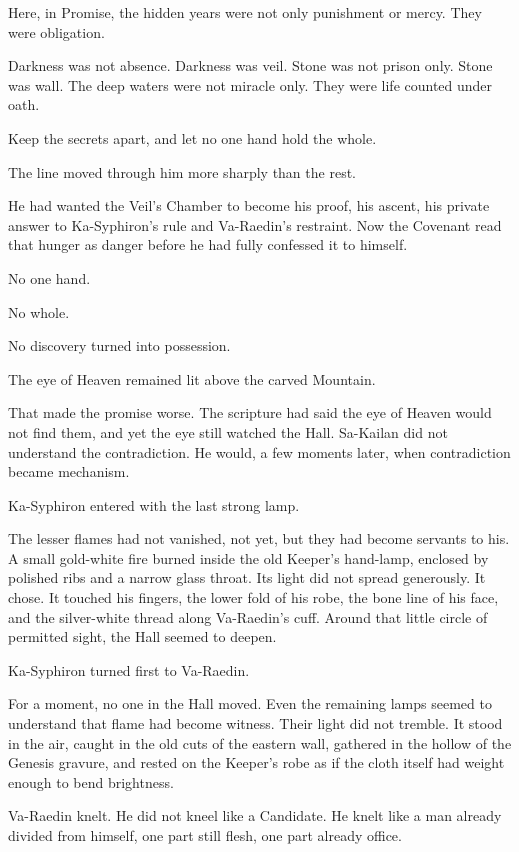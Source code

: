 Here, in Promise, the hidden years were not only punishment or mercy.
They were obligation.\par
Darkness was not absence.
Darkness was veil.
Stone was not prison only.
Stone was wall.
The deep waters were not miracle only.
They were life counted under oath.\par
Keep the secrets apart, and let no one hand hold the whole.\par
The line moved through him more sharply than the rest.\par
He had wanted the Veil’s Chamber to become his proof, his ascent, his private answer to Ka-Syphiron’s rule and Va-Raedin’s restraint.
Now the Covenant read that hunger as danger before he had fully confessed it to himself.\par
No one hand.\par
No whole.\par
No discovery turned into possession.\par
The eye of Heaven remained lit above the carved Mountain.\par
That made the promise worse.
The scripture had said the eye of Heaven would not find them, and yet the eye still watched the Hall.
Sa-Kailan did not understand the contradiction.
He would, a few moments later, when contradiction became mechanism.\par
Ka-Syphiron entered with the last strong lamp.\par
The lesser flames had not vanished, not yet, but they had become servants to his.
A small gold-white fire burned inside the old Keeper’s hand-lamp, enclosed by polished ribs and a narrow glass throat.
Its light did not spread generously.
It chose.
It touched his fingers, the lower fold of his robe, the bone line of his face, and the silver-white thread along Va-Raedin’s cuff.
Around that little circle of permitted sight, the Hall seemed to deepen.\par
Ka-Syphiron turned first to Va-Raedin.\par
For a moment, no one in the Hall moved.
Even the remaining lamps seemed to understand that flame had become witness.
Their light did not tremble.
It stood in the air, caught in the old cuts of the eastern wall, gathered in the hollow of the Genesis gravure, and rested on the Keeper’s robe as if the cloth itself had weight enough to bend brightness.\par
Va-Raedin knelt.
He did not kneel like a Candidate.
He knelt like a man already divided from himself, one part still flesh, one part already office.

